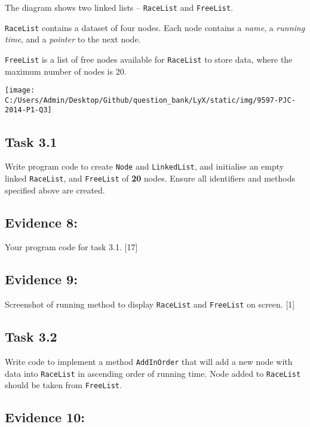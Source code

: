 The diagram shows two linked lists -- \texttt{RaceList} and \texttt{FreeList}.

\texttt{RaceList} contains a dataset of four nodes. Each node contains
a \emph{name}, a \emph{running time}, and a \emph{pointer} to the
next node. 

\texttt{FreeList} is a list of free nodes available for \texttt{RaceList}
to store data, where the maximum number of nodes is 20.
\begin{center}
\texttt{[image: C:/Users/Admin/Desktop/Github/question\_bank/LyX/static/img/9597-PJC-2014-P1-Q3]}
\par\end{center}

\subsection*{Task 3.1 }

Write program code to create \texttt{Node} and \texttt{LinkedList},
and initialise an empty linked \texttt{RaceList}, and \texttt{FreeList}
of \textbf{20} nodes. Ensure all identifiers and methods specified
above are created. 

\subsection*{Evidence 8: }

Your program code for task 3.1. \hfill{}{[}17{]}

\subsection*{Evidence 9: }

Screenshot of running method to display \texttt{RaceList} and \texttt{FreeList}
on screen. \hfill{}{[}1{]}

\subsection*{Task 3.2 }

Write code to implement a method \texttt{AddInOrder} that will add
a new node with data into \texttt{RaceList} in ascending order of
running time. Node added to \texttt{RaceList} should be taken from
\texttt{FreeList}. 

\subsection*{Evidence 10: }


